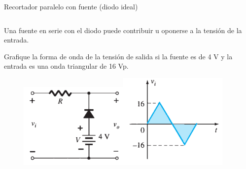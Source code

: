 \documentclass[t,aspectratio=169]{beamer}
\begin{document}
\begin{frame}{Recortador paralelo con fuente (diodo ideal)}

\begin{columns}
\begin{column}{0.5\textwidth}

Una fuente en serie con el diodo puede contribuir u oponerse a la tensión de la entrada.

\vspace{5mm}Grafique la forma de onda de la tensión de salida si la fuente es de 4 V y la entrada es una onda triangular de 16 Vp.

\begin{figure}
    \centering
    \includegraphics[width=0.5\textwidth]{figures/recortador_paralelo_ideal_fuente_circuito_1.png}\includegraphics[width=0.5\textwidth]{figures/recortador_paralelo_ideal_fuente_circuito_2.png}
\end{figure}

\end{column}
\begin{column}{0.5\textwidth}


\end{column}
\end{columns}
\end{frame}
\end{document}
